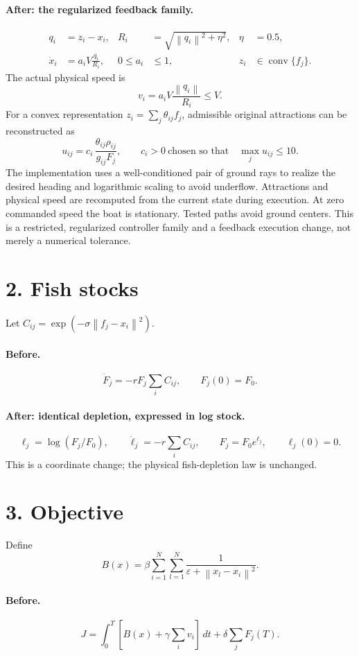 \documentclass[11pt]{article}
\newcommand{\norm}[1]{\left\lVert #1\right\rVert}
\begin{document}
\paragraph{After: the regularized feedback family.}
\begin{align}
q_i&=z_i-x_i,&R_i&=\sqrt{\norm{q_i}^2+\eta^2},&\eta&=0.5,\\
\dot x_i&=a_iV\frac{q_i}{R_i},&
0\leq a_i&\leq1,&
z_i&\in\operatorname{conv}\{f_j\}.
\end{align}
The actual physical speed is
\[
v_i=a_iV\frac{\norm{q_i}}{R_i}\leq V.
\]
For a convex representation \(z_i=\sum_j\theta_{ij}f_j\), admissible original
attractions can be reconstructed as
\[
u_{ij}=c_i\,\frac{\theta_{ij}\rho_{ij}}{g_{ij}F_j},
\qquad c_i>0\ \text{chosen so that}\quad \max_j u_{ij}\leq10 .
\]
The implementation uses a well-conditioned pair of ground rays to realize
the desired heading and logarithmic scaling to avoid underflow. Attractions
and physical speed are recomputed from the current state during execution.
At zero commanded speed the boat is stationary. Tested paths avoid ground
centers. This is a restricted, regularized controller family and a feedback
execution change, not merely a numerical tolerance.

\section*{2. Fish stocks}
Let \(C_{ij}=\exp(-\sigma\norm{f_j-x_i}^2)\).

\paragraph{Before.}
\[
\dot F_j=-rF_j\sum_i C_{ij},\qquad F_j(0)=F_0.
\]

\paragraph{After: identical depletion, expressed in log stock.}
\[
\ell_j=\log(F_j/F_0),\qquad
\dot\ell_j=-r\sum_i C_{ij},\qquad
F_j=F_0e^{\ell_j},\qquad \ell_j(0)=0.
\]
This is a coordinate change; the physical fish-depletion law is unchanged.

\section*{3. Objective}
Define
\[
B(x)=\beta\sum_{i=1}^{N}\sum_{l=1}^{N}
\frac{1}{\varepsilon+\norm{x_l-x_i}^2}.
\]

\paragraph{Before.}
\[
J=\int_0^T\left[B(x)+\gamma\sum_i v_i\right]\,dt
  +\delta\sum_j F_j(T).
\]
\end{document}
